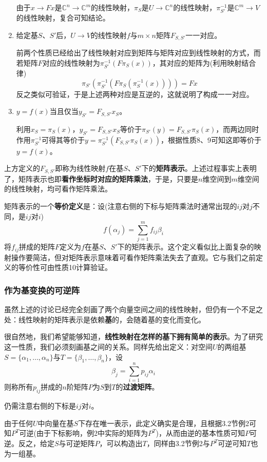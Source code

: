 \documentclass[a4paper,UTF8,fontset=windows]{ctexart}
\newcommand*{\note}{\noindent *}
\begin{document}
\begin{enumerate}
    由于$x\to Fx$是$\mathbb{C}^n\to\mathbb{C}^m$的线性映射，$\pi_S$是$U\to\mathbb{C}^n$的线性映射，$\pi_{S'}^{-1}$是$\mathbb{C}^m\to V$的线性映射，复合可知结论。
    
    \item 给定基$S$、$S'$后，$U\to V$的线性映射$f$与$m\times n$矩阵$F_{S,S'}$一一对应。
    
    前两个性质已经给出了线性映射对应到矩阵与矩阵对应到线性映射的方式，而若矩阵$F$对应的线性映射为$\pi_{S'}^{-1}(F\pi_S(x))$，其对应的矩阵为(利用映射结合律)
    $$\pi_{S'}(\pi_{S'}^{-1}(F\pi_S(\pi_S^{-1}(x))))=Fx$$
    反之类似可验证，于是上述两种对应是互逆的，这就说明了构成一一对应。
    
    \item $y=f(x)$当且仅当$y_{S'}=F_{S,S'}x_S$。
    
    利用$x_S=\pi_S(x)$，$y_{S'}=F_{S,S'}x_S$等价于$\pi_{S'}(y)=F_{S,S'}\pi_S(x)$，而两边同时作用$\pi_{S'}^{-1}$可得其等价于$y=\pi_{S'}^{-1}(F_{S,S'}\pi_S(x))$，根据性质8、9可知这即等价于$y=f(x)$。
\end{enumerate}

上方定义的$F_{S,S'}$即称为线性映射$f$在基$S$、$S'$下的\textbf{矩阵表示}。上述过程事实上表明了，矩阵表示也即\textbf{看作坐标时对应的矩阵乘法}，于是，只要是$n$维空间到$m$维空间的线性映射，均可看作矩阵乘法。

矩阵表示的一个\textbf{等价定义}是：设(注意右侧的下标与矩阵乘法时通常出现的$ij$对$j$不同，是$ij$对$i$)
$$f(\alpha_j)=\sum_{j=1}^mf_{ij}\beta_i$$
将$f_{ij}$拼成的矩阵$F$定义为$f$在基$S$、$S'$下的矩阵表示。这个定义看似比上面复杂的映射操作要简洁，但对矩阵表示意味着可看作矩阵乘法失去了直观。它与我们之前定义的等价性可由性质10计算验证。

\subsubsection{作为基变换的可逆阵}
虽然上述的讨论已经完全刻画了两个向量空间之间的线性映射，但仍有一个不足之处：线性映射的矩阵表示是依赖\textbf{基}的，会随着基的变化而变化。

很自然地，我们希望能够知道，\textbf{线性映射在怎样的基下拥有简单的表示}。为了研究这一性质，我们必须刻画基之间的关系。同样先给出定义：对空间$U$的两组基$S=\{\alpha_1,\dots,\alpha_n\}$与$T=\{\beta_1,\dots,\beta_n\}$，设
$$\beta_j=\sum_{i=1}^np_{ij}\alpha_i$$
则称所有$p_{ij}$拼成的$n$阶矩阵$P$为$S$到$T$的\textbf{过渡矩阵}。

\note 仍需注意右侧的下标是$ij$对$i$。

由于任何$U$中向量在基$S$下存在唯一表示，此定义确实是合理，且根据3.2节例2可知$P^T$可逆(由于下标影响，例2中实际的矩阵为$P^T$)，从而由逆的基本性质可知$P$可逆。反之，给定$S$与可逆矩阵$P$，可以构造出$T$，同样由3.2节例2与$P^T$可逆可知$T$也为一组基。
\end{document}
